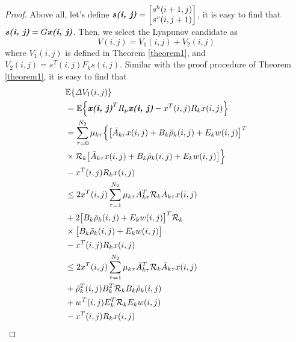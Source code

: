 \documentclass[conference]{IEEEtran}
\begin{document}
\begin{proof} 
	Above all, let's define $\emph{\textbf{s(i, j)}} = \begin{bmatrix}
	s^{h}(i+1,j)\\ s^{v}(i,j+1)
	\end{bmatrix}$,  it is easy to find that $\emph{\textbf{s(i, j)}}=G\emph{\textbf{x(i, j)}}$.  Then, we select the Lyapunov candidate as
	\begin{equation}\label{LyapunoovT}
		V(i,j)=V_{1}(i,j)+V_{2}(i,j)
	\end{equation}
	where $V_{1}(i,j)$ is defined in Theorem \ref{theorem1}, and $V_{2}(i,j)=s^{T}(i,j)F_{k}s(i,j)$. Similar with the proof procedure of Theorem \ref{theorem1}, it is easy to find that
	\begin{equation} \label{P2T1}
		\begin{split}
				&\mathbb{E}\{\varDelta V_{1}(i,j) \}\\
			&=\mathbb{E}\Big\{\emph{\textbf{x(i, j)}}^{T}R_{p}\emph{\textbf{x(i, j)}} - x^{T}(i,j)R_{k}x(i,j)\Big\}\\
			&=  \sum_{\tau =0}^{N_{2}}\mu_{k\tau }\Big\{\big[\bar{A}_{k\tau }x(i,j)+B_{k}\bar{\rho}_{k}(i,j)+E_{k}w(i,j)\big]^{T}\\
			&\times\mathcal{R}_{k} \big[ \bar{A}_{k\tau }x(i,j)+B_{k}\bar{\rho}_{k}(i,j)+E_{k}w(i,j)\big]\Big\}\\
			&-x^{T}(i,j)R_{k}x(i,j)\\
			&\leq 2x^{T}(i,j)\sum_{\tau =1}^{N_{2}}\mu_{k\tau }\bar{A}^{T}_{k\tau }\mathcal{R}_{k}\bar{A}_{k\tau }x(i,j) \\
			&+2\big[B_{k}\bar{\rho}_{k}(i,j)+E_{k}w(i,j)\big]^{T}\mathcal{R}_{k}\\
			&\times\big[B_{k}\bar{\rho}_{k}(i,j)+E_{k}w(i,j)\big]\\
			&-x^{T}(i,j)R_{k}x(i,j)\\
			&\leq 2x^{T}(i,j)\sum_{\tau =1}^{N_{2}}\mu_{k\tau }\bar{A}^{T}_{k\tau }\mathcal{R}_{k}\bar{A}_{k\tau }x(i,j) \\
			&+ \bar{\rho}^{T}_{k}(i,j)B^{T}_{k}\mathcal{R}_{k}B_{k}\bar{\rho}_{k}(i,j)\\
			&+w^{T}(i,j)E^{T}_{k}\mathcal{R}_{k}E_{k}w(i,j)\\
			&-x^{T}(i,j)R_{k}x(i,j)

\end{split}
\end{equation}
\end{proof}
\end{document}
